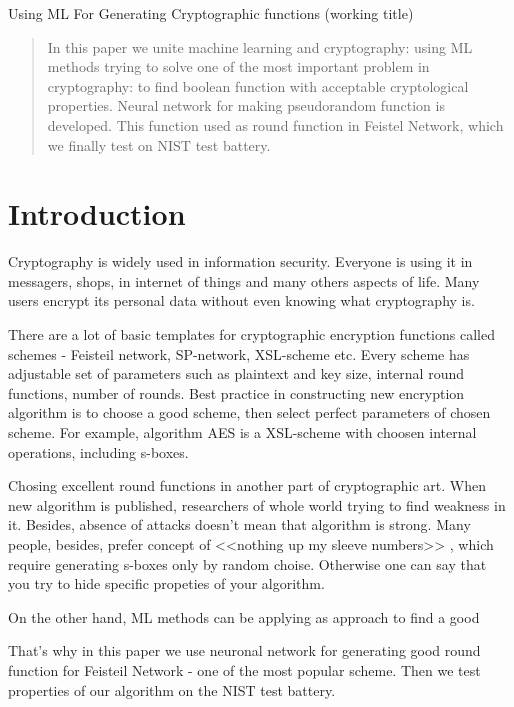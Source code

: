 \documentclass[a4paper,onecolumn,twoside,12pt]{article}
\begin{document}
\thispagestyle{empty}


Using ML For Generating Cryptographic 
functions
(working title)
   



\begin{abstract}
In this paper we unite machine learning 
and cryptography: using ML methods 
trying to solve one of the 
most important problem
in cryptography: to find boolean
function with acceptable cryptological
properties. Neural network for making pseudorandom
function is developed. This function 
used as round function in Feistel Network, which 
 we finally test on NIST test battery.


\end{abstract} 

\tableofcontents

\section{Introduction}

Cryptography is widely used in
information security. 
Everyone is using it in messagers, shops, 
in internet of things and many others 
aspects of life. Many users
encrypt its personal data without even 
knowing what cryptography is. 

There are a lot of basic templates
for cryptographic encryption
functions called schemes - Feisteil network, SP-network, XSL-scheme etc. 
Every scheme has adjustable
set of parameters such as 
plaintext and key size, internal
round functions, number of rounds. 
Best practice in constructing new encryption
algorithm is to choose a good scheme, 
then select perfect parameters of chosen scheme.
For example, algorithm AES is a XSL-scheme 
with choosen internal operations, including s-boxes.

Chosing excellent round functions in another part 
of cryptographic art.
When new algorithm is published,
researchers of whole world trying to find 
 weakness in it.
 Besides, absence of attacks 
 doesn't mean that algorithm is strong. 
 Many people, besides,  prefer  concept of 
 <<nothing up my sleeve numbers>> \cite{NMSN}, 
 which require generating s-boxes only 
 by random choise. Otherwise one can say that you
 try to hide specific propeties of your algorithm.
 
 
 On the other hand, ML methods can be applying as
 approach to find a good 
 
 That's why in this paper we use neuronal network for generating good round function 
 for Feisteil Network - one of the most popular scheme.
 Then we test properties of our algorithm on the NIST test battery.
\end{document}
